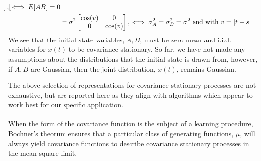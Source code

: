 \begin{defn}
\begin{align}
\begin{bmatrix}
\end{bmatrix}, \text{$\iff E[AB] =0$} \\ 
&=\sigma^2 \begin{bmatrix} 
\cos(v) & 0 \\ 
0 & \cos(v)  \\
\end{bmatrix}, \text{$ \iff \sigma_A^2 = \sigma_B^2 = \sigma^2$ and with $v= |t-s|$} \label{eqn:cov_circle}
\end{align}
We see that the initial state variables, $A,B$, must be zero mean and i.i.d. variables for $x(t)$ to be covariance stationary. So far, we have not made any assumptions about the distributions that the initial state is drawn from, however, if $A,B$ are Gaussian, then the joint distribution, $x(t)$, remains Gaussian.
\end{defn}

The above selection of representations for covariance stationary processes are not exhaustive, but are reported here as they align with algorithms which appear to work best for our specific application.
\\
\\
When the form of the covariance function is the subject of a learning procedure, Bochner's theorum ensures that a particular class of generating functions, $\mu$, will always yield covariance functions to describe covariance stationary processes in the mean square limit.

